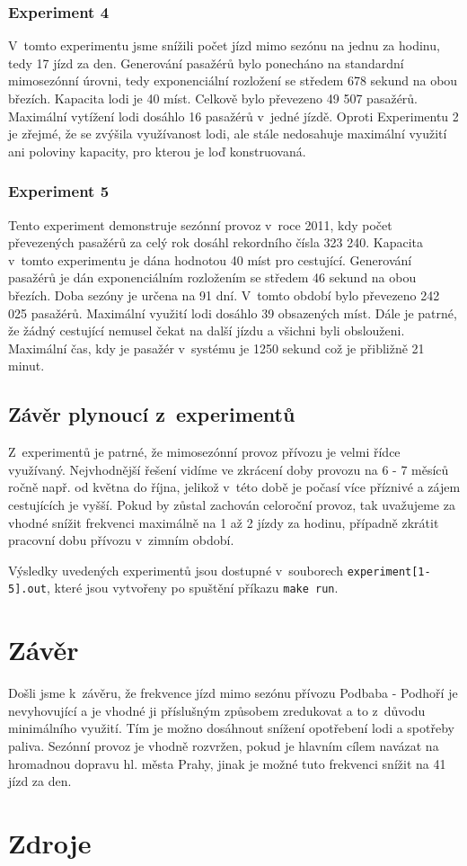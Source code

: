 \documentclass[11pt,a4paper]{article}
\begin{document}
	\subsubsection{Experiment 4}
	V~tomto experimentu jsme snížili počet jízd mimo sezónu na jednu za hodinu, tedy 17 jízd za den. Generování pasažérů
	bylo ponecháno na standardní mimosezónní úrovni, tedy exponenciální rozložení se středem 678 sekund
	na obou březích. Kapacita lodi je 40 míst. Celkově bylo převezeno 49 507 pasažérů. Maximální vytížení
	lodi dosáhlo 16 pasažérů v~jedné jízdě. Oproti Experimentu 2 je zřejmé, že se zvýšila využívanost lodi,
	ale stále nedosahuje maximální využití ani poloviny kapacity, pro kterou je loď konstruovaná.

	\subsubsection{Experiment 5}
	Tento experiment demonstruje sezónní provoz v~roce 2011, kdy počet převezených pasažérů
	za celý rok dosáhl rekordního čísla 323 240. Kapacita v~tomto experimentu je dána hodnotou 40 míst pro
	cestující. Generování pasažérů je dán exponenciálním rozložením se středem 46 sekund na obou
	březích. Doba sezóny je určena na 91 dní. V~tomto období bylo převezeno 242 025 pasažérů.
	Maximální využití lodi dosáhlo 39 obsazených míst. Dále je patrné, že žádný cestující
	nemusel čekat na další jízdu a všichni byli obslouženi. Maximální čas, kdy je pasažér v~systému je
	1250 sekund což je přibližně 21 minut.

	\subsection{Závěr plynoucí z~experimentů}
	Z~experimentů je patrné, že mimosezónní provoz přívozu je velmi řídce využívaný.
	Nejvhodnější řešení vidíme ve zkrácení doby provozu na 6 - 7 měsíců ročně např.
	od května do října, jelikož v~této době je počasí více příznivé a zájem cestujících
	je vyšší. Pokud by zůstal zachován celoroční provoz, tak uvažujeme za vhodné snížit
	frekvenci maximálně na 1 až 2 jízdy za hodinu, případně zkrátit pracovní dobu přívozu
	v~zimním období.

	Výsledky uvedených experimentů jsou dostupné v~souborech \texttt{experiment[1-5].out},
	které jsou vytvořeny po spuštění příkazu \texttt{make run}.

	\section{Závěr}
	Došli jsme k~závěru, že frekvence jízd mimo sezónu přívozu Podbaba - Podhoří je nevyhovující a je vhodné ji příslušným způsobem
	zredukovat a to z~důvodu minimálního využití. Tím je možno dosáhnout snížení opotřebení lodi a spotřeby paliva.
	Sezónní provoz je vhodně rozvržen, pokud je hlavním cílem navázat na hromadnou dopravu hl. města Prahy, jinak je možné
	tuto frekvenci snížit na 41 jízd za den.

	\newpage
	\section{Zdroje}
		
\end{document}
